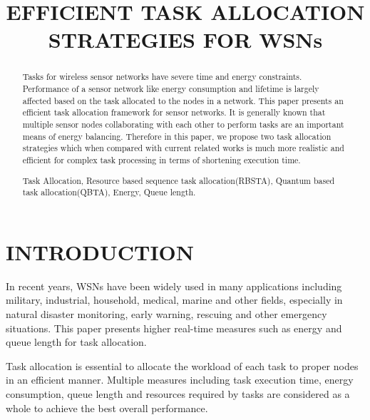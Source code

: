 \documentclass[conference]{IEEEtran}
\begin{document}
\title{EFFICIENT TASK ALLOCATION STRATEGIES FOR WSNs}


\author{
\and
{}
\and
{}
}
\maketitle
\IEEEpeerreviewmaketitle



\begin{abstract} 
Tasks for wireless sensor networks have severe time and energy constraints. Performance of a sensor network like energy consumption and lifetime is largely affected based on the task allocated to the nodes in a network. This paper presents an efficient task allocation framework for sensor networks. It is generally known that multiple sensor nodes collaborating with each other to perform tasks are an important means of energy balancing. Therefore in this paper, we propose two task allocation strategies which when compared with current related works is much more realistic and efficient for complex task processing in terms of shortening execution time. \\
\begin{IEEEkeywords}
Task Allocation, Resource based sequence task allocation(RBSTA), Quantum based task allocation(QBTA), Energy, Queue length.
\end{IEEEkeywords}
\end{abstract}
\section{INTRODUCTION}
\par In recent years, WSNs have been widely used in many applications including military, industrial, household, medical, marine and other fields, especially in natural disaster monitoring, early warning, rescuing and other emergency situations. This paper presents higher real-time measures such as energy and queue length for task allocation.
\par Task allocation is essential to allocate the workload of each task to proper nodes in an efficient manner. Multiple measures including task execution time, energy consumption, queue length and resources required by tasks are considered as a whole to achieve the best overall performance. 
\end{document}
